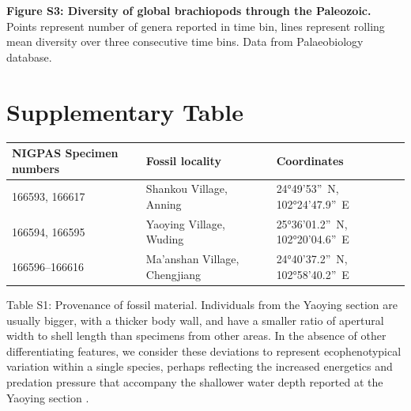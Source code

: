 \documentclass[openany]{book}
\theoremstyle{definition}
\theoremstyle{definition}
\theoremstyle{definition}
\theoremstyle{remark}
\begin{document}
\textbf{Figure S3: Diversity of global brachiopods through the
Paleozoic.} Points represent number of genera reported in time bin,
lines represent rolling mean diversity over three consecutive time bins.
Data from Palaeobiology database.

\hypertarget{supplementary-table}{%
\chapter{Supplementary Table}\label{supplementary-table}}

\begin{longtable}[]{@{}lll@{}}
\toprule
NIGPAS Specimen numbers & Fossil locality & Coordinates\tabularnewline
\midrule
\endhead
166593, 166617 & Shankou Village, Anning & 24°49'53''~N,
102°24'47.9''~E\tabularnewline
166594, 166595 & Yaoying Village, Wuding & 25°36'01.2''~N,
102°20'04.6''~E\tabularnewline
166596--166616 & Ma'anshan Village, Chengjiang & 24°40'37.2''~N,
102°58'40.2''~E\tabularnewline
\bottomrule
\end{longtable}

Table S1: Provenance of fossil material. Individuals from the Yaoying
section are usually bigger, with a thicker body wall, and have a smaller
ratio of apertural width to shell length than specimens from other
areas. In the absence of other differentiating features, we consider
these deviations to represent ecophenotypical variation within a single
species, perhaps reflecting the increased energetics and predation
pressure that accompany the shallower water depth reported at the
Yaoying section \citep{Zhao2012}.


\end{document}
